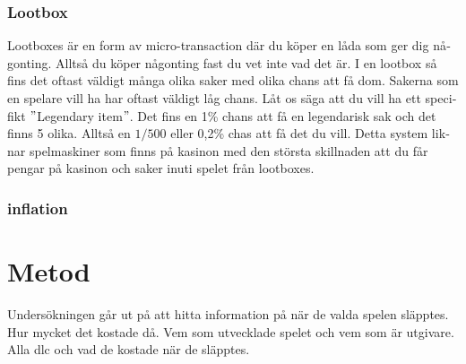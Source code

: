 \documentclass[11p]{article}
\begin{document}
\begin{otherlanguage}{swedish}
    \subsubsection{Lootbox}
    Lootboxes är en form av micro-transaction där du köper en låda som ger dig någonting.
    Alltså du köper någonting fast du vet inte vad det är.
    I en lootbox så fins det oftast väldigt många olika saker med olika chans att få dom.
    Sakerna som en spelare vill ha har oftast väldigt låg chans.
    Låt os säga att du vill ha ett specifikt \("\)Legendary item\("\).
    Det fins en 1\% chans att få en legendarisk sak och det finns 5 olika.
    Alltså en \(1/500\) eller 0,2\% chas att få det du vill.
    Detta system liknar spelmaskiner som finns på kasinon med den största skillnaden att du får pengar på kasinon och saker inuti spelet från lootboxes.

    \subsubsection{inflation}




\section{Metod}

     Undersökningen går ut på att hitta information på när de valda spelen släpptes.
     Hur mycket det kostade då. %
     Vem som utvecklade spelet och vem som är utgivare.
     Alla dlc och vad de kostade när de släpptes.

    \printbibliography[title={Referenser}]

    \end{otherlanguage}
\end{document}

